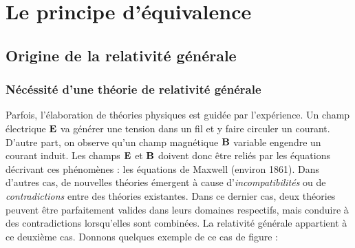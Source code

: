 \chapter{Le principe d'équivalence}

\section{Origine de la relativité générale}


\subsection{Nécéssité d'une théorie de relativité générale}
Parfois, l'élaboration de théories physiques est guidée par l'expérience. Un champ électrique $\bm{\mathrm{E}}$ va générer une tension dans un fil et y faire circuler un courant. D'autre part, on observe qu'un champ magnétique $\bm{\mathrm{B}}$ variable engendre un courant induit. Les champs $\bm{\mathrm{E}}$ et $\bm{\mathrm{B}}$ doivent donc être reliés par les équations décrivant ces phénomènes : les équations de Maxwell (environ 1861).
Dans d'autres cas, de nouvelles théories émergent à cause d'\emph{incompatibilités} ou de \emph{contradictions} entre des théories existantes. Dans ce dernier cas, deux théories peuvent être parfaitement valides dans leurs domaines respectifs, mais conduire à des contradictions lorsqu'elles sont combinées. La relativité générale appartient à ce deuxième cas. Donnons quelques exemple de ce cas de figure :

